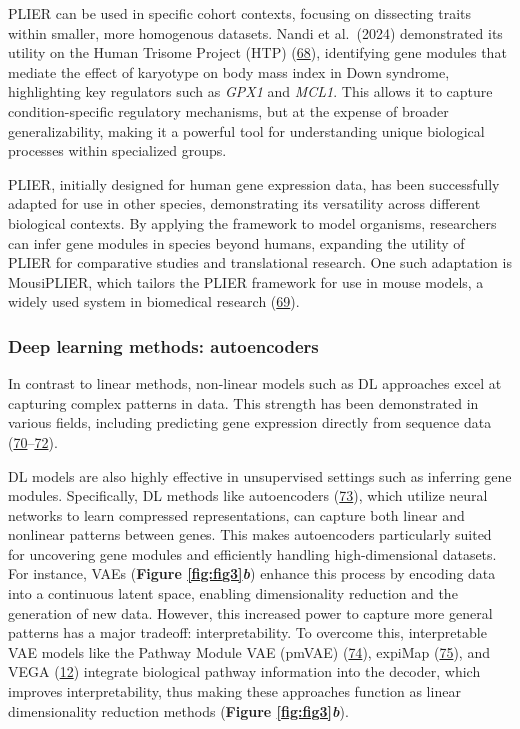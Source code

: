 PLIER can be used in specific cohort contexts, focusing on dissecting traits within smaller, more homogenous datasets.
Nandi et al.~(2024) demonstrated its utility on the Human Trisome Project (HTP) (\protect\hyperlink{ref-v5DtVejF}{68}), identifying gene modules that mediate the effect of karyotype on body mass index in Down syndrome, highlighting key regulators such as \emph{GPX1} and \emph{MCL1}.
This allows it to capture condition-specific regulatory mechanisms, but at the expense of broader generalizability, making it a powerful tool for understanding unique biological processes within specialized groups.

PLIER, initially designed for human gene expression data, has been successfully adapted for use in other species, demonstrating its versatility across different biological contexts.
By applying the framework to model organisms, researchers can infer gene modules in species beyond humans, expanding the utility of PLIER for comparative studies and translational research.
One such adaptation is MousiPLIER, which tailors the PLIER framework for use in mouse models, a widely used system in biomedical research (\protect\hyperlink{ref-1CDQw6VDO}{69}).

\hypertarget{deep-learning-methods-autoencoders}{%
\subsubsection{Deep learning methods: autoencoders}\label{deep-learning-methods-autoencoders}}

In contrast to linear methods, non-linear models such as DL approaches excel at capturing complex patterns in data.
This strength has been demonstrated in various fields, including predicting gene expression directly from sequence data (\protect\hyperlink{ref-1HNaN8NTb}{70}--\protect\hyperlink{ref-Gy0Zkruj}{72}).

DL models are also highly effective in unsupervised settings such as inferring gene modules.
Specifically, DL methods like autoencoders (\protect\hyperlink{ref-NLVTJ9Lj}{73}), which utilize neural networks to learn compressed representations, can capture both linear and nonlinear patterns between genes.
This makes autoencoders particularly suited for uncovering gene modules and efficiently handling high-dimensional datasets.
For instance, VAEs (\textbf{Figure \ref{fig:fig3}\emph{b}}) enhance this process by encoding data into a continuous latent space, enabling dimensionality reduction and the generation of new data.
However, this increased power to capture more general patterns has a major tradeoff: interpretability.
To overcome this, interpretable VAE models like the Pathway Module VAE (pmVAE) (\protect\hyperlink{ref-nGVsOd2S}{74}), expiMap (\protect\hyperlink{ref-JkqcQgM7}{75}), and VEGA (\protect\hyperlink{ref-170T6ip47}{12}) integrate biological pathway information into the decoder, which improves interpretability, thus making these approaches function as linear dimensionality reduction methods
(\textbf{Figure \ref{fig:fig3}\emph{b}}).

